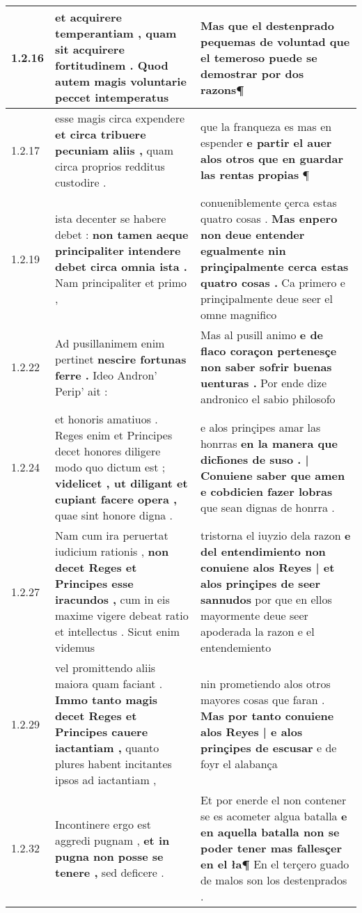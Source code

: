 \begin{tabular}{|p{1cm}|p{6.5cm}|p{6.5cm}|}
1.2.16 & et acquirere temperantiam , \textbf{ quam sit acquirere fortitudinem . } Quod autem magis voluntarie peccet intemperatus & Mas que el \textbf{ destenprado pequemas de voluntad que el temeroso puede se demostrar } por dos razons¶ \\\hline
1.2.17 & esse magis circa expendere \textbf{ et circa tribuere pecuniam aliis , } quam circa proprios redditus custodire . & que la franqueza es mas en espender \textbf{ e partir el auer alos otros que en guardar las rentas propias } ¶ \\\hline
1.2.19 & ista decenter se habere debet : \textbf{ non tamen aeque principaliter intendere debet circa omnia ista . } Nam principaliter et primo , & conueniblemente çerca estas quatro cosas . \textbf{ Mas enpero non deue entender egualmente nin prinçipalmente cerca estas quatro cosas . } Ca primero e prinçipalmente deue seer el omne magnifico \\\hline
1.2.22 & Ad pusillanimem enim pertinet \textbf{ nescire fortunas ferre . } Ideo Andron’ Perip’ ait : & Mas al pusill animo \textbf{ e de flaco coraçon pertenesçe non saber sofrir buenas uenturas . } Por ende dize andronico el sabio philosofo \\\hline
1.2.24 & et honoris amatiuos . Reges enim et Principes decet honores diligere modo quo dictum est ; \textbf{ videlicet , ut diligant et cupiant facere opera , } quae sint honore digna . & e alos prinçipes amar las honrras \textbf{ en la manera que dich̃ones de suso . | Conuiene saber que amen e cobdicien fazer lobras } que sean dignas de honrra . \\\hline
1.2.27 & Nam cum ira peruertat iudicium rationis , \textbf{ non decet Reges et Principes esse iracundos , } cum in eis maxime vigere debeat ratio et intellectus . Sicut enim videmus & tristorna el iuyzio dela razon \textbf{ e del entendimiento non conuiene alos Reyes | et alos prinçipes de seer sannudos } por que en ellos mayormente deue seer apoderada la razon e el entendemiento \\\hline
1.2.29 & vel promittendo aliis maiora quam faciant . \textbf{ Immo tanto magis decet Reges et Principes cauere iactantiam , } quanto plures habent incitantes ipsos ad iactantiam , & nin prometiendo alos otros mayores cosas que faran . \textbf{ Mas por tanto conuiene alos Reyes | e alos prinçipes de escusar } e de foyr el alabança \\\hline
1.2.32 & Incontinere ergo est aggredi pugnam , \textbf{ et in pugna non posse se tenere , } sed deficere . & Et por enerde el non contener se es acometer algua batalla \textbf{ e en aquella batalla non se poder tener mas fallesçer en el ła¶ } En el terçero guado de malos son los destenprados . \\\hline

\end{tabular}
